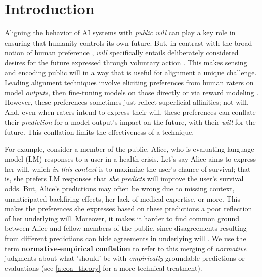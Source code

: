 \documentclass{article}
\begin{document}
\section{Introduction}

Aligning the behavior of AI systems with \emph{public will} 
can play a key role in ensuring that humanity controls its own future. But, in contrast with the broad notion of human preference \cite{zhixuan2024preferences}, \emph{will} specifically entails deliberately considered desires for the future expressed through voluntary action \cite{konya2023deliberative}. This makes sensing and encoding public will in a way that is useful for alignment a unique challenge.
Leading alignment techniques involve eliciting preferences from human raters on model \emph{outputs}, then fine-tuning models on those directly \cite{rafailov2024direct, xu2024dpo, an2023direct, wang2023beyond} 
or via reward modeling \cite{ouyang2022training, stiennon2020learning, christiano2017deep, glaese2022improving, bai2022training}. 
However, these preferences sometimes just reflect superficial affinities; not will. And, even when raters intend to express their will, these preferences can conflate their \emph{prediction} for a model output's impact on the future, with their \emph{will} for the future. This conflation limits the effectiveness of a technique.

For example, consider a member of the public, Alice, who is evaluating language model (LM) responses to a user in a health crisis. Let's say Alice aims to express her will, which \emph{in this context} is to maximize the user's chance of survival; that is, she prefers LM responses that \emph{she predicts} will improve the user's survival odds. But, Alice's predictions may often be wrong due to missing context, unanticipated backfiring effects, her lack of medical expertise, or more. This makes the preferences she expresses based on these predictions a poor reflection of her underlying will. Moreover, it makes it harder to find common ground between Alice and fellow members of the public, since disagreements resulting from different predictions can hide agreements in underlying will \cite{gordon2022jury}. We use the term \textbf{normative-empirical conflation} to refer to this merging of \emph{normative} judgments about what 'should' be with \emph{empirically} groundable predictions or evaluations (see \ref{a:coa_theory} for a more technical treatment). 
\end{document}

